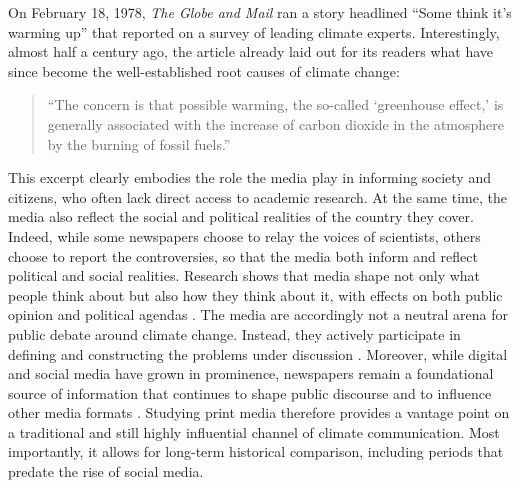 \documentclass[12pt]{article}
\renewcommand\_{\texttt{\detokenize{_}\allowbreak}}
\begin{document}
On February 18, 1978, \textit{The Globe and Mail} ran a story headlined ``Some think it's warming up'' that reported on a survey of leading climate experts. Interestingly, almost half a century ago, the article already laid out for its readers what have since become the well-established root causes of climate change:
\begin{quote}
``The concern is that possible warming, the so-called `greenhouse effect,' is generally associated with the increase of carbon dioxide in the atmosphere by the burning of fossil fuels.''
\end{quote}
This excerpt clearly embodies the role the media play in informing society and citizens, who often lack direct access to academic research. At the same time, the media also reflect the social and political realities of the country they cover. Indeed, while some newspapers choose to relay the voices of scientists, others choose to report the controversies, so that the media both inform and reflect political and social realities. Research shows that media shape not only what people think about but also how they think about it, with effects on both public opinion and political agendas \autocite{scheufele_framing_2007, walgrave_contingency_2006}. The media are accordingly not a neutral arena for public debate around climate change. Instead, they actively participate in defining and constructing the problems under discussion \autocite{cohen_folk_1972, trevino_media_2018}. Moreover, while digital and social media have grown in prominence, newspapers remain a foundational source of information that continues to shape public discourse and to influence other media formats \parencite{bastos_shares_2015, casero-ripolles_impact_2020}. Studying print media therefore provides a vantage point on a traditional and still highly influential channel of climate communication. Most importantly, it allows for long-term historical comparison, including periods that predate the rise of social media.
\end{document}
